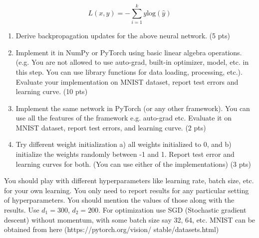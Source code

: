\documentclass[letter]{article}
\theoremstyle{definition}
\begin{document}
\[
L(x, y) = -\sum_{i=1}^k y \text{log}(\hat{y})
\]

\begin{enumerate}
    \item Derive backpropagation updates for the above neural network. (5 pts)
    \item Implement it in NumPy or PyTorch using basic linear algebra operations. (e.g. You are not allowed to use auto-grad, built-in optimizer, model, etc. in this step. You can use library functions for data loading, processing, etc.). Evaluate your implementation on MNIST dataset, report test errors and learning curve. (10 pts)
    \item Implement the same network in PyTorch (or any other framework). You can use all the features of the framework e.g. auto-grad etc. Evaluate it on MNIST dataset, report test errors, and learning curve. (2 pts)
    \item Try different weight initialization a) all weights initialized to 0, and b) initialize the weights randomly between -1 and 1. Report test error and learning curves for both. (You can use either of the implementations) (3 pts)
\end{enumerate}

You should play with different hyperparameters like learning rate, batch size, etc. for your own learning. You only need to report results for any particular setting of hyperparameters. You should mention the values of those along with the results. Use $d_1 = 300$, $d_2 = 200$. For optimization use SGD (Stochastic gradient descent) without momentum, with some batch size say 32, 64, etc. MNIST can be obtained from here (https://pytorch.org/vision/ stable/datasets.html)


\end{document}
